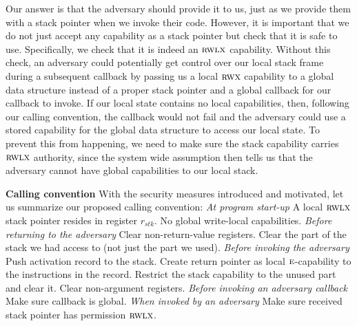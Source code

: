 \documentclass{llncs}
\newcommand{\var}[1]{\mathit{#1}}
\newcommand{\stk}{\var{stk}}
\newcommand{\plainperm}[1]{\textsc{#1}}
\newcommand{\entry}{\plainperm{e}}
\newcommand{\rwx}{\plainperm{rwx}}
\newcommand{\rwlx}{\plainperm{rwlx}}
\begin{document}
Our answer is that the adversary should provide it to us, just as we provide
them with a stack pointer when we invoke their code. However, it is important
that we do not just accept any capability as a stack pointer but check that it
is safe to use. Specifically, we check that it is indeed an $\rwlx$ capability. Without
this check, an adversary could potentially get control over our local stack
frame during a subsequent callback by passing us a local $\rwx$ capability to a global data
structure instead of a proper stack pointer
and a global callback for our callback to invoke. If our local state contains no
local capabilities, then, following our calling convention, the callback would
not fail and the adversary could use a stored capability for the global data
structure to access our local state. To prevent this from happening, we need to
make sure the stack capability carries $\rwlx$ authority, since the system wide assumption then
tells us that the adversary cannot have global capabilities to our local stack.

\textbf{Calling convention} With the security measures introduced and motivated,
let us summarize our proposed calling convention: \textit{At program start-up} A
local $\rwlx$ stack pointer resides in register $r_\stk$. No global write-local
capabilities. \textit{Before returning to the adversary} Clear non-return-value
registers. Clear the part of the stack we had access to (not just the part we
used). \textit{Before invoking the adversary} Push activation record to the
stack. Create return pointer as local $\entry$-capability to the instructions in
the record.  Restrict the stack capability to the unused part and clear
it. Clear non-argument registers. \textit{Before invoking an adversary callback}
Make sure callback is global. \textit{When invoked by an adversary} Make sure
received stack pointer has permission $\rwlx$.
\end{document}
